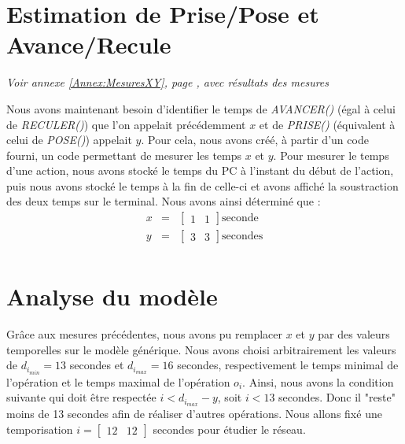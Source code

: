 \section{Estimation de Prise/Pose et Avance/Recule}\label{sec:estimationTemps}
\begin{center}
\textit{Voir annexe \ref{Annex:MesuresXY}, page \pageref{Annex:MesuresXY}, avec résultats des mesures}
\end{center}
Nous avons maintenant besoin d'identifier le temps de \emph{AVANCER()} (égal à celui de \emph{RECULER()}) que l'on appelait précédemment $x$  et de \emph{PRISE()} (équivalent à celui de \emph{POSE()}) appelait $y$. Pour cela, nous avons créé, à partir d'un code fourni, un code permettant de mesurer les temps $x$ et $y$. Pour mesurer le temps d'une action, nous avons stocké le temps du PC à l'instant du début de l'action, puis nous avons stocké le temps à la fin de celle-ci et avons affiché la soustraction des deux temps sur le terminal. 
Nous avons ainsi déterminé que :
\begin{eqnarray}
x &=& \begin{bmatrix}
1 & 1
\end{bmatrix} \text{seconde}\\
y &=& \begin{bmatrix}
3 & 3
\end{bmatrix} \text{secondes}\\
\end{eqnarray}

\section{Analyse du modèle}
Grâce aux mesures précédentes, nous avons pu remplacer $x$ et $y$ par des valeurs temporelles sur le modèle générique. Nous avons choisi arbitrairement les valeurs de $d_{i_{min}} = 13$ secondes et $d_{i_{max}} = 16$ secondes, respectivement le temps minimal de l'opération et le temps maximal de l'opération $o_i$.  Ainsi, nous avons la condition suivante qui doit être respectée $i <d_{i_{max}}-y$, soit $i < 13$ secondes. Donc il "reste" moins de 13 secondes afin de réaliser d'autres opérations. Nous allons fixé une temporisation  $i=\begin{bmatrix}
12& 12
\end{bmatrix}$ secondes pour étudier le réseau. 

